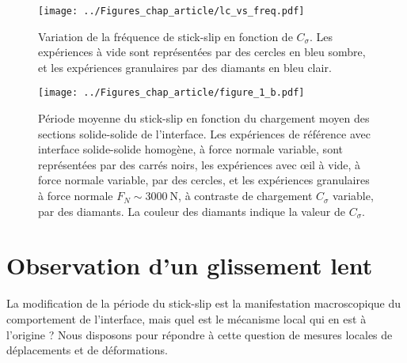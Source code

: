 \begin{figure}[h!]
\centering
\texttt{[image: ../Figures\_chap\_article/lc\_vs\_freq.pdf]}
\caption[Fréquence de stick-slip en fonction de $C_\sigma$]{Variation de la fréquence de stick-slip en fonction de $C_\sigma$. Les expériences à vide sont représentées par des cercles en bleu sombre, et les expériences granulaires par des diamants en bleu clair.}
\label{fig:freqlc}
\end{figure}


\begin{figure}[h!]
\centering
\texttt{[image: ../Figures\_chap\_article/figure\_1\_b.pdf]}
\caption[Fréquence du stick-slip en fonction de la contrainte normale]{Période moyenne du stick-slip en fonction du chargement moyen des sections solide-solide de l'interface. Les expériences de référence avec interface solide-solide homogène, à force normale variable, sont représentées par des carrés noirs, les expériences avec œil à vide, à force normale variable, par des cercles, et les expériences granulaires à force normale $F_N\sim\SI{3000}{\newton}$, à contraste de chargement $C_\sigma$ variable, par des diamants. La couleur des diamants indique la valeur de $C_\sigma$.}
\label{fig:frequencyfn}
\end{figure}




\section{Observation d'un glissement lent}


La modification de la période du stick-slip est la manifestation macroscopique du comportement de l'interface, mais quel est le mécanisme local qui en est à l'origine ? Nous disposons pour répondre à cette question de mesures locales de déplacements et de déformations.


